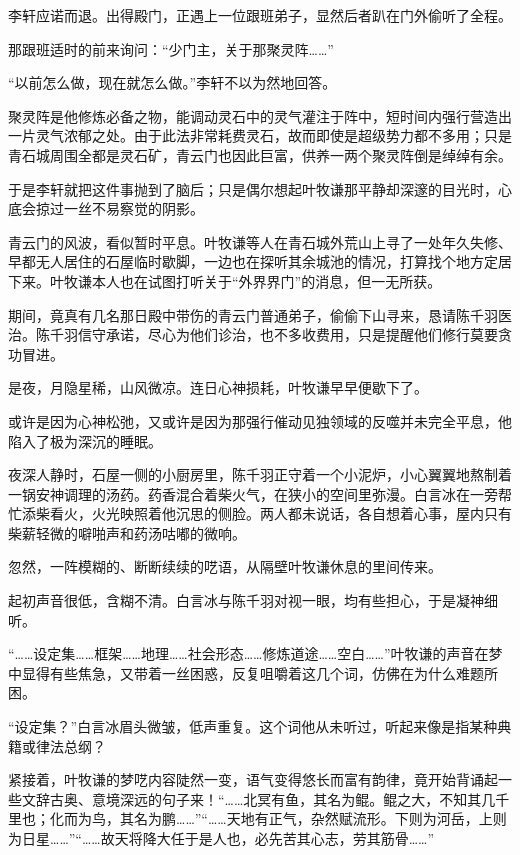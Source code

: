 李轩应诺而退。出得殿门，正遇上一位跟班弟子，显然后者趴在门外偷听了全程。

那跟班适时的前来询问：“少门主，关于那聚灵阵……”

“以前怎么做，现在就怎么做。”李轩不以为然地回答。

聚灵阵是他修炼必备之物，能调动灵石中的灵气灌注于阵中，短时间内强行营造出一片灵气浓郁之处。由于此法非常耗费灵石，故而即使是超级势力都不多用；只是青石城周围全都是灵石矿，青云门也因此巨富，供养一两个聚灵阵倒是绰绰有余。

于是李轩就把这件事抛到了脑后；只是偶尔想起叶牧谦那平静却深邃的目光时，心底会掠过一丝不易察觉的阴影。

\vspace{2em}

青云门的风波，看似暂时平息。叶牧谦等人在青石城外荒山上寻了一处年久失修、早都无人居住的石屋临时歇脚，一边也在探听其余城池的情况，打算找个地方定居下来。叶牧谦本人也在试图打听关于“外界界门”的消息，但一无所获。

期间，竟真有几名那日殿中带伤的青云门普通弟子，偷偷下山寻来，恳请陈千羽医治。陈千羽信守承诺，尽心为他们诊治，也不多收费用，只是提醒他们修行莫要贪功冒进。

是夜，月隐星稀，山风微凉。连日心神损耗，叶牧谦早早便歇下了。

或许是因为心神松弛，又或许是因为那强行催动见独领域的反噬并未完全平息，他陷入了极为深沉的睡眠。

夜深人静时，石屋一侧的小厨房里，陈千羽正守着一个小泥炉，小心翼翼地熬制着一锅安神调理的汤药。药香混合着柴火气，在狭小的空间里弥漫。白言冰在一旁帮忙添柴看火，火光映照着他沉思的侧脸。两人都未说话，各自想着心事，屋内只有柴薪轻微的噼啪声和药汤咕嘟的微响。

忽然，一阵模糊的、断断续续的呓语，从隔壁叶牧谦休息的里间传来。

起初声音很低，含糊不清。白言冰与陈千羽对视一眼，均有些担心，于是凝神细听。

“……设定集……框架……地理……社会形态……修炼道途……空白……”叶牧谦的声音在梦中显得有些焦急，又带着一丝困惑，反复咀嚼着这几个词，仿佛在为什么难题所困。

“设定集？”白言冰眉头微皱，低声重复。这个词他从未听过，听起来像是指某种典籍或律法总纲？

紧接着，叶牧谦的梦呓内容陡然一变，语气变得悠长而富有韵律，竟开始背诵起一些文辞古奥、意境深远的句子来！“……北冥有鱼，其名为鲲。鲲之大，不知其几千里也；化而为鸟，其名为鹏……”“……天地有正气，杂然赋流形。下则为河岳，上则为日星……”“……故天将降大任于是人也，必先苦其心志，劳其筋骨……”

